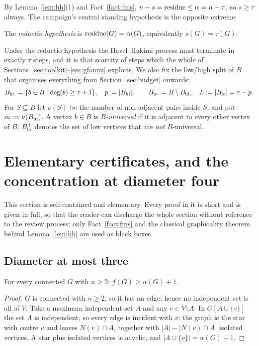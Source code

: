 By Lemma~\ref{lem:hh}(1) and Fact~\ref{fact:fms}, $n - s = \operatorname{residue} \le \alpha = n - \tau$, so
$s \ge \tau$ always. The campaign's central standing hypothesis is the opposite extreme:

\begin{definition}\label{def:reductio}
The \emph{reductio hypothesis} is $\operatorname{residue}(G) = \alpha(G)$, equivalently $s(G) = \tau(G)$.
\end{definition}

Under the reductio hypothesis the Havel--Hakimi process must terminate in exactly $\tau$
steps, and it is that scarcity of steps which the whole of
Sections~\ref{sec:toolkit}--\ref{sec:gfannu} exploits. We also fix the low/high split of
$B$ that organises everything from Section~\ref{sec:budget} onwards:
\[
B_{\mathrm{hi}} := \{b \in B : \mathrm{deg}(b) \ge \tau+1\}, \quad p := |B_{\mathrm{hi}}|, \qquad
B_{\mathrm{lo}} := B \setminus B_{\mathrm{hi}}, \quad L := |B_{\mathrm{lo}}| = \tau - p.
\]
For $S \subseteq B$ let $\nu(S)$ be the number of non-adjacent pairs inside $S$, and put
$\bar{m} := \nu(B_{\mathrm{hi}})$. A vertex $b \in B$ is \emph{$B$-universal} if it is adjacent to every
other vertex of $B$; $B_{\mathrm{lo}}^{+}$ denotes the set of low vertices that are \emph{not}
$B$-universal.

\section{Elementary certificates, and the concentration at diameter four}
\label{sec:elementary}

This section is self-contained and elementary. Every proof in it is short and is given in
full, so that the reader can discharge the whole section without reference to the review
process; only Fact~\ref{fact:fms} and the classical graphicality theorem behind
Lemma~\ref{lem:hh} are used as black boxes.

\subsection{Diameter at most three}

\begin{lemma}\label{lem:f-alpha}
\Selem
For every connected $G$ with $n \ge 2$: $f(G) \ge \alpha(G) + 1$.
\end{lemma}

\begin{proof}
$G$ is connected with $n \ge 2$, so it has an edge; hence no independent set is all of $V$.
Take a maximum independent set $A$ and any $v \in V \setminus A$. In $G[A \cup \{v\}]$ the
set $A$ is independent, so every edge is incident with $v$: the graph is the star with
centre $v$ and leaves $N(v) \cap A$, together with $|A| - |N(v) \cap A|$ isolated vertices.
A star plus isolated vertices is acyclic, and $|A \cup \{v\}| = \alpha(G) + 1$.
\end{proof}

